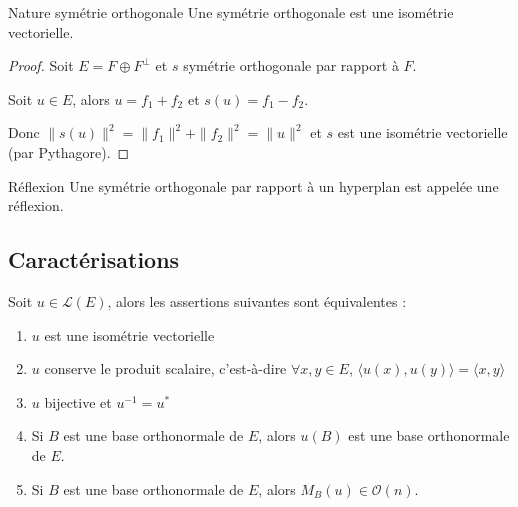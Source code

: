 \begin{proposition}{Nature symétrie orthogonale}{}
    Une symétrie orthogonale est une isométrie vectorielle.
\end{proposition}


\begin{proof}
    Soit $E = F \oplus F^\perp$ et $s$ symétrie orthogonale par rapport à $F$. 

    Soit $u \in E$, alors $u = f_1 + f_2$ et $s(u) = f_1 - f_2$.

    Donc $\| s(u) \|^2 = \| f_1 \|^2 + \| f_2 \|^2 = \| u \|^2$ et $s$ est une isométrie vectorielle 
    (par Pythagore).
\end{proof}

\begin{definition}{Réflexion}{}
    Une symétrie orthogonale par rapport à un hyperplan est appelée une réflexion. 
\end{definition}

\subsection{Caractérisations}
\label{Caracterisation_isos}

\begin{theoreme}{}{}
    Soit $u \in \mathscr L(E)$, alors les assertions suivantes sont équivalentes :
    \begin{enumerate}
        \item $u$ est une isométrie vectorielle
        \item $u$ conserve le produit scalaire, c'est-à-dire 
        $\forall x, y \in E$, $\langle u(x), u(y) \rangle = \langle x, y \rangle$
        \item $u$ bijective et $u^{-1} = u^*$
        \item Si $B$ est une base orthonormale de $E$, alors $u(B)$ est une base orthonormale de $E$.
        \item Si $B$ est une base orthonormale de $E$, alors $M_B(u) \in \mathcal O(n)$.
    \end{enumerate}
\end{theoreme}



